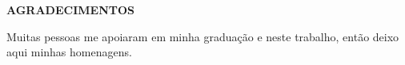 \begin{center}
\textbf{AGRADECIMENTOS} \\ [2.5cm]
\end{center}

Muitas pessoas me apoiaram em minha graduação e neste trabalho, então deixo aqui minhas homenagens.

